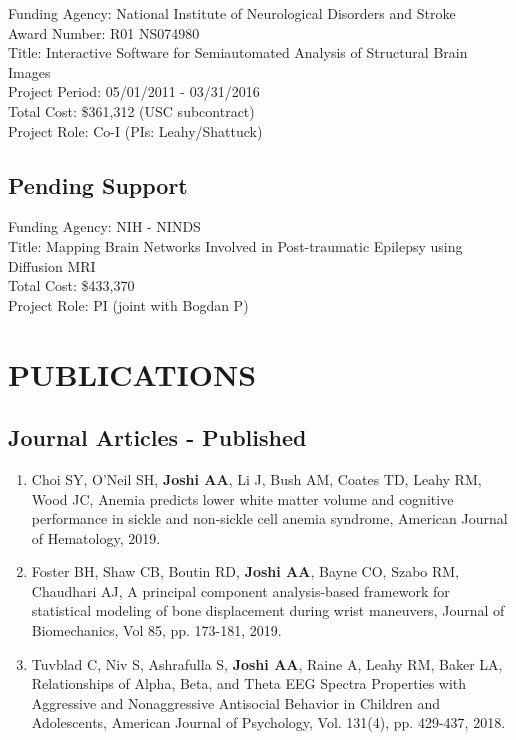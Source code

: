 \documentclass[overlapped,line,letterpaper]{res}
\begin{document}
\begin{resume}
Funding Agency: National Institute of Neurological Disorders and Stroke\\
Award Number: R01 NS074980 \\
Title: Interactive Software for Semiautomated Analysis of Structural Brain  Images \\
Project Period: 05/01/2011 - 03/31/2016 \\
Total Cost: \$361,312 (USC subcontract) \\
Project Role: Co-I (PIs: Leahy/Shattuck) \\

\subsection{Pending Support}

Funding Agency: NIH - NINDS\\
Title: Mapping Brain Networks Involved in Post-traumatic Epilepsy using Diffusion MRI \\
Total Cost:  \$433,370 \\
Project Role: PI (joint with Bogdan P)\\

\newpage
\section{PUBLICATIONS}
\subsection{Journal Articles -  Published}
\begin{enumerate}

    \item  Choi SY, O'Neil SH, \textbf{Joshi AA}, Li J, Bush AM, Coates TD, Leahy RM, Wood JC, {Anemia predicts lower white matter volume and cognitive performance in sickle and non‐sickle cell anemia syndrome}, American Journal of Hematology, 2019.

    \item Foster BH, Shaw CB, Boutin RD, \textbf{Joshi AA}, Bayne CO, Szabo RM, Chaudhari AJ, {A principal component analysis-based framework for statistical modeling of bone displacement during wrist maneuvers}, {Journal of Biomechanics}, Vol 85, pp. 173-181, 2019.

    \item Tuvblad C, Niv S, Ashrafulla S, \textbf{Joshi AA}, Raine A, Leahy RM, Baker LA, {Relationships of Alpha, Beta, and Theta EEG Spectra Properties with Aggressive and Nonaggressive Antisocial Behavior in Children and Adolescents}, {American Journal of Psychology}, Vol. 131(4), pp. 429-437, 2018.


\end{enumerate}
\end{resume}
\end{document}
